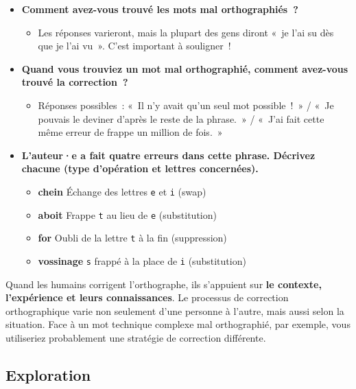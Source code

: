 \documentclass[12pt,a4paper]{article}
\begin{document}
\begin{thinkbox}
  \begin{itemize}
    \item \textbf{Comment avez-vous trouvé les mots mal orthographiés~?}
    \begin{itemize}
      \item Les réponses varieront, mais la plupart des gens diront «~je l'ai su dès que je l'ai vu~». C'est important à souligner~!
    \end{itemize}
    \item \textbf{Quand vous trouviez un mot mal orthographié, comment avez-vous trouvé la correction~?}
    \begin{itemize}
      \item Réponses possibles~: «~Il n'y avait qu'un seul mot possible~!~» / «~Je pouvais le deviner d'après le reste de la phrase.~» / «~J'ai fait cette même erreur de frappe un million de fois.~»
    \end{itemize}
    \item \textbf{L'auteur·e a fait quatre erreurs dans cette phrase. Décrivez chacune (type d'opération et lettres concernées).}
    \begin{itemize}
      \item \textbf{chein} \quad Échange des lettres \texttt{e} et \texttt{i} (swap)
      \item \textbf{aboit} \quad Frappe \texttt{t} au lieu de \texttt{e} (substitution)
      \item \textbf{for} \quad Oubli de la lettre \texttt{t} à la fin (suppression)
      \item \textbf{vossinage} \quad \texttt{s} frappé à la place de \texttt{i} (substitution)
    \end{itemize}
  \end{itemize}
\end{thinkbox}

\begin{keypointbox}
  Quand les humains corrigent l'orthographe, ils s'appuient sur \textbf{le contexte, l'expérience et leurs connaissances}. Le processus de correction orthographique varie non seulement d'une personne à l'autre, mais aussi selon la situation. Face à un mot technique complexe mal orthographié, par exemple, vous utiliseriez probablement une stratégie de correction différente.
\end{keypointbox}

\subsection{Exploration}
\end{document}
